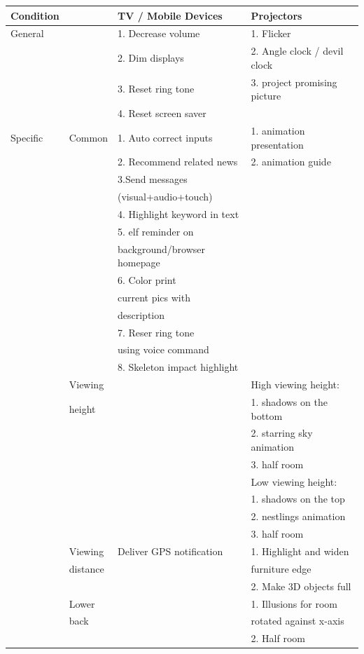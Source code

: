 \begin{table}
\centering
\begin{tabular}{l l l l} 
\hline\hline
 Condition && TV / Mobile Devices & Projectors\\
\hline\hline
General & &1. Decrease volume & 1. Flicker\\
 & &2. Dim displays &2. Angle clock / devil clock\\
& &3. Reset ring tone &3. project promising picture\\
 & &4. Reset screen saver &\\
\hline
Specific & Common &1. Auto correct
inputs  &1. animation presentation\\  
 & &2. Recommend related news  & 2. animation guide\\
 & &3.Send messages & \\
 & &  (visual+audio+touch) &\\
 & &4. Highlight keyword in text &\\
&&  5. elf reminder on &\\
& &  background/browser homepage & \\
& &6. Color print & \\
& &  current pics with &\\
&&  description &\\
& &7. Reser ring tone &\\
& & using voice command & \\
& & 8. Skeleton impact highlight& \\
\hline
 & Viewing & & High viewing height:\\
 & height & & 1. shadows on the bottom\\
 & & & 2. starring sky animation\\
 & & & 3. half room\\
 & & & Low viewing height:\\
& & & 1. shadows on the top\\
 & & & 2. nestlings animation\\
 & & & 3. half room\\
\hline
&Viewing & Deliver GPS notification &1. Highlight and widen\\
& distance & &  furniture edge\\
& & & 2. Make 3D objects full\\ 
\hline
& Lower & &1. Illusions for room\\
 & back & &  rotated against x-axis\\
 & & & 2. Half room\\

\end{tabular}
\end{table}

